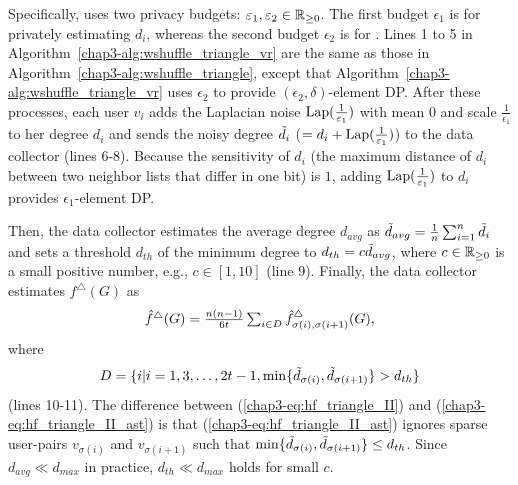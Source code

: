 Specifically, \AlgWSTriVR{} uses two privacy budgets: $\varepsilon_1, \varepsilon_2 \in \mathbb{R}_{\ge0}$.
The first budget $\epsilon_1$ is for privately estimating $d_i$, whereas the second budget $\epsilon_2$ is for
\AlgWSLE{}.
Lines 1 to 5 in Algorithm~\ref{chap3-alg:wshuffle_triangle_vr} are the same as those in Algorithm~\ref{chap3-alg:wshuffle_triangle}, except that Algorithm~\ref{chap3-alg:wshuffle_triangle_vr} uses $\epsilon_2$
to provide $(\epsilon_2, \delta)$-element DP.
After these processes, each user $v_i$ adds the Laplacian noise $\textrm{Lap}(\frac{1}{\varepsilon_1})$ with mean $0$ and scale $\frac{1}{\epsilon_1}$ to her degree $d_i$ and sends the noisy degree $\tilde{d}_i$ ($= d_i + \textrm{Lap}(\frac{1}{\varepsilon_1})$) to the data collector (lines 6-8).
Because the sensitivity \cite{DP} of $d_i$ (the maximum distance of $d_i$ between two neighbor lists that differ in one bit) is $1$, adding $\textrm{Lap}(\frac{1}{\varepsilon_1})$ to $d_i$ provides $\epsilon_1$-element DP.

Then, the data collector estimates the average degree $d_{avg}$ as $\tilde{d}_{avg} = \frac{1}{n}\sum_{i=1}^n \tilde{d}_i$ and sets a threshold $d_{th}$ of the minimum degree to $d_{th} = c \tilde{d}_{avg}$, where $c \in \mathbb{R}_{\ge0}$ is a small positive number, e.g.,
$c \in [1,10]$ (line 9).
Finally, the data collector estimates $f^\triangle(G)$ as
\begin{align}
    \textstyle{\hat{f}^\triangle(G) = \frac{n(n-1)}{6t} \sum_{i \in D} \hat{f}_{\sigma(i),\sigma(i+1)}^\triangle(G),}
   \label{chap3-eq:hf_triangle_II_ast}
\end{align}
where
\begin{align*}
D = \{i | i = 1, 3, \ldots, 2t-1,
  \min\{\tilde{d}_{\sigma(i)}, \tilde{d}_{\sigma(i+1)}\} > d_{th}\}
\end{align*}
(lines 10-11).
The difference between (\ref{chap3-eq:hf_triangle_II}) and (\ref{chap3-eq:hf_triangle_II_ast}) is that (\ref{chap3-eq:hf_triangle_II_ast}) ignores sparse user-pairs $v_{\sigma(i)}$ and $v_{\sigma(i+1)}$ such that $\min\{\tilde{d}_{\sigma(i)}, \tilde{d}_{\sigma(i+1)}\} \leq d_{th}$.
Since
$d_{avg} \ll d_{max}$ in practice,
$d_{th} \ll d_{max}$
holds for small $c$.

